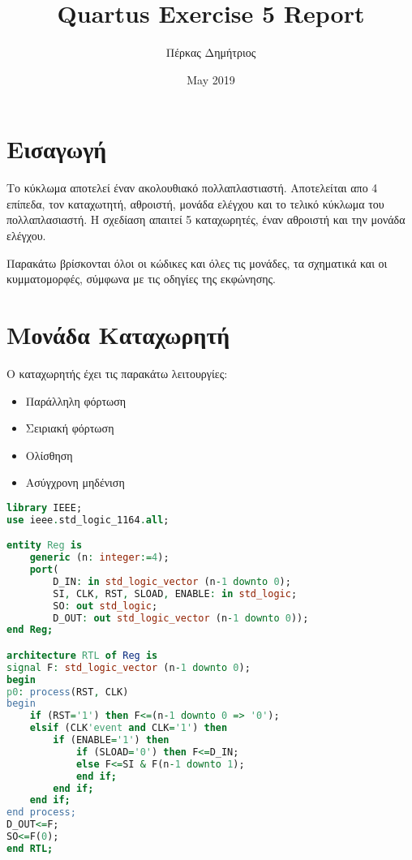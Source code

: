 \documentclass{article}
\title{\foreignlanguage{english}{Quartus Exercise 5 Report}}
\author{Πέρκας Δημήτριος}
\date{\foreignlanguage{english}{May 2019}}
\begin{document}
\maketitle
\thispagestyle{empty}

\clearpage
\thispagestyle{empty}
\tableofcontents
\listoffigures
\clearpage
{}

\section{Εισαγωγή}

Το κύκλωμα αποτελεί έναν ακολουθιακό πολλαπλαστιαστή. Αποτελείται απο 4 επίπεδα, τον καταχωτητή, αθροιστή, μονάδα ελέγχου και το τελικό κύκλωμα του πολλαπλασιαστή. Η σχεδίαση απαιτεί 5 καταχωρητές, έναν αθροιστή και την μονάδα ελέγχου.

Παρακάτω βρίσκονται όλοι οι κώδικες και όλες τις μονάδες, τα σχηματικά και οι κυμματομορφές, σύμφωνα με τις οδηγίες της εκφώνησης.


\section{Μονάδα Καταχωρητή}

Ο καταχωρητής έχει τις παρακάτω λειτουργίες:
\begin{itemize}
    \item Παράλληλη φόρτωση
    \item Σειριακή φόρτωση
    \item Ολίσθηση
    \item Ασύγχρονη μηδένιση
\end{itemize}


\begin{otherlanguage}{english}
\begin{lstlisting}[language=VHDL, caption= Register VHDL Code]
library IEEE;
use ieee.std_logic_1164.all;

entity Reg is
	generic (n: integer:=4);
	port(
		D_IN: in std_logic_vector (n-1 downto 0);
		SI, CLK, RST, SLOAD, ENABLE: in std_logic;
		SO: out std_logic;
		D_OUT: out std_logic_vector (n-1 downto 0));
end Reg;

architecture RTL of Reg is
signal F: std_logic_vector (n-1 downto 0);
begin
p0: process(RST, CLK)
begin
	if (RST='1') then F<=(n-1 downto 0 => '0');
	elsif (CLK'event and CLK='1') then
		if (ENABLE='1') then
			if (SLOAD='0') then F<=D_IN;
			else F<=SI & F(n-1 downto 1);
			end if;
		end if;
	end if;
end process;
D_OUT<=F;
SO<=F(0);
end RTL;
\end{lstlisting}
\end{otherlanguage}
\end{document}
